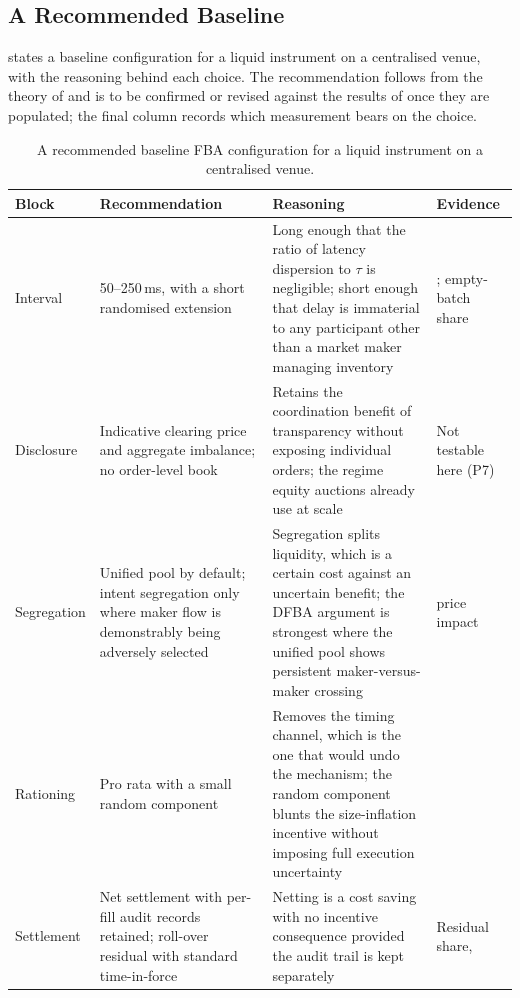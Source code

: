 \subsection{A Recommended Baseline}

 states a baseline configuration for a liquid
instrument on a centralised venue, with the reasoning behind each
choice. The recommendation follows from the theory of 
and is to be confirmed or revised against the results of
 once they are populated; the final column records
which measurement bears on the choice.

\begin{table}[htbp]
\centering
\caption[Recommended baseline configuration]{A recommended baseline FBA
configuration for a liquid instrument on a centralised venue.}
\label{tab:recommendation}
\small
\begin{tabularx}{\textwidth}{@{}p{2.3cm} p{3.0cm} L p{2.4cm}@{}}
\toprule
\textbf{Block} & \textbf{Recommendation} & \textbf{Reasoning} &
\textbf{Evidence}\\
\midrule
Interval & 50--250\,ms, with a short randomised extension &
Long enough that the ratio of latency dispersion to $\tau$ is
negligible; short enough that delay is immaterial to any participant
other than a market maker managing inventory & ;
empty-batch share\\
Disclosure & Indicative clearing price and aggregate imbalance; no
order-level book & Retains the coordination benefit of transparency
without exposing individual orders; the regime equity auctions already
use at scale & Not testable here (P7)\\
Segregation & Unified pool by default; intent segregation only where
maker flow is demonstrably being adversely selected & Segregation splits
liquidity, which is a certain cost against an uncertain benefit; the
DFBA argument is strongest where the unified pool shows persistent
maker-versus-maker crossing &  price impact\\
Rationing & Pro rata with a small random component & Removes the timing
channel, which is the one that would undo the mechanism; the random
component blunts the size-inflation incentive without imposing full
execution uncertainty & \\
Settlement & Net settlement with per-fill audit records retained;
roll-over residual with standard time-in-force & Netting is a cost
saving with no incentive consequence provided the audit trail is kept
separately & Residual share, \\
\bottomrule
\end{tabularx}
\end{table}

